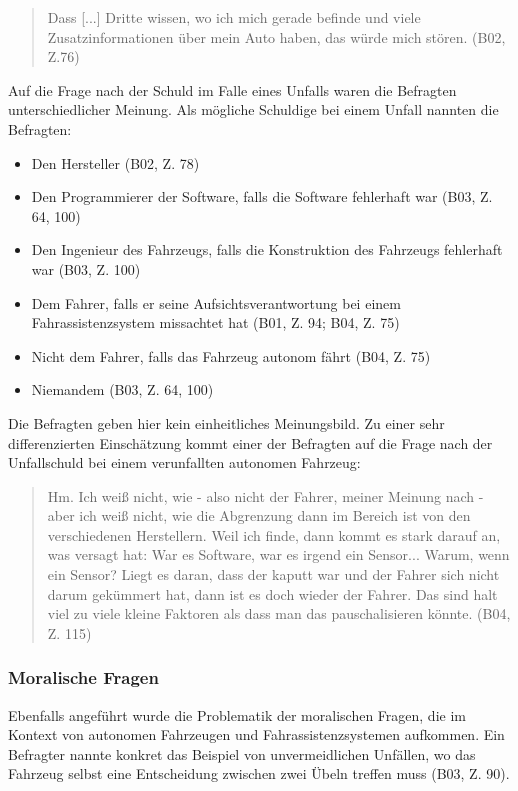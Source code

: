 \documentclass[12pt]{article}
\begin{document}
\begin{quote}
  Dass [...] Dritte wissen, wo ich mich gerade befinde und viele Zusatzinformationen über mein Auto haben, das würde mich stören. (B02, Z.76)
\end{quote}

Auf die Frage nach der Schuld im Falle eines Unfalls waren die Befragten unterschiedlicher Meinung. Als mögliche Schuldige bei einem Unfall nannten die Befragten:
\begin{itemize}
  \item Den Hersteller (B02, Z. 78)
  \item Den Programmierer der Software, falls die Software fehlerhaft war (B03, Z. 64, 100)
  \item Den Ingenieur des Fahrzeugs, falls die Konstruktion des Fahrzeugs fehlerhaft war (B03, Z. 100)
  \item Dem Fahrer, falls er seine Aufsichtsverantwortung bei einem Fahrassistenzsystem missachtet hat (B01, Z. 94; B04, Z. 75)
  \item Nicht dem Fahrer, falls das Fahrzeug autonom fährt (B04, Z. 75)
  \item Niemandem (B03, Z. 64, 100)
\end{itemize}

Die Befragten geben hier kein einheitliches Meinungsbild. Zu einer sehr differenzierten Einschätzung kommt einer der Befragten auf die Frage nach der Unfallschuld bei einem verunfallten autonomen Fahrzeug:

\begin{quote}
  Hm. Ich weiß nicht, wie - also nicht der Fahrer, meiner Meinung nach - aber ich weiß nicht, wie die Abgrenzung dann im Bereich ist von den verschiedenen Herstellern. Weil ich finde, dann kommt es stark darauf an, was versagt hat: War es Software, war es irgend ein Sensor... Warum, wenn ein Sensor? Liegt es daran, dass der kaputt war und der Fahrer sich nicht darum gekümmert hat, dann ist es doch wieder der Fahrer. Das sind halt viel zu viele kleine Faktoren als dass man das pauschalisieren könnte. (B04, Z. 115)
\end{quote}

\subsubsection*{Moralische Fragen}
Ebenfalls angeführt wurde die Problematik der moralischen Fragen, die im Kontext von autonomen Fahrzeugen und Fahrassistenzsystemen aufkommen. Ein Befragter nannte konkret das Beispiel von unvermeidlichen Unfällen, wo das Fahrzeug selbst eine Entscheidung zwischen zwei Übeln treffen muss (B03, Z. 90).
\end{document}
